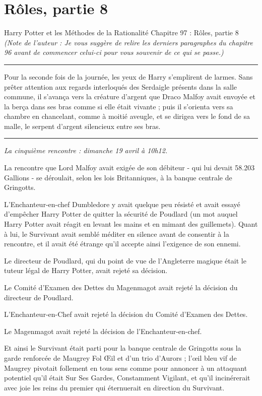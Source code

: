 
\chapter{Rôles, partie 8}
Harry Potter et les Méthodes de la Rationalité Chapitre 97 : Rôles, partie 8
\emph{(Note de l'auteur : Je vous suggère de relire les derniers paragraphes du chapitre 96 avant de commencer celui-ci pour vous souvenir de ce qui se passe.)} 
\par\noindent\rule{\textwidth}{0.4pt}
Pour la seconde fois de la journée, les yeux de Harry s'emplirent de larmes. Sans prêter attention aux regards interloqués des Serdaigle présents dans la salle commune, il s'avança vers la créature d'argent que Draco Malfoy avait envoyée et la berça dans ses bras comme si elle était vivante ; puis il s'orienta vers sa chambre en chancelant, comme à moitié aveugle, et se dirigea vers le fond de sa malle, le serpent d'argent silencieux entre ses bras.
\par\noindent\rule{\textwidth}{0.4pt}
\emph{La cinquième rencontre : dimanche 19 avril à 10h12.} 

La rencontre que Lord Malfoy avait exigée de son débiteur - qui lui devait 58.203 Gallions - se déroulait, selon les lois Britanniques, à la banque centrale de Gringotts.

L'Enchanteur-en-chef Dumbledore y avait quelque peu résisté et avait essayé d'empêcher Harry Potter de quitter la sécurité de Poudlard (un mot auquel Harry Potter avait réagit en levant les mains et en mimant des guillemets). Quant à lui, le Survivant avait semblé méditer en silence avant de consentir à la rencontre, et il avait été étrange qu'il accepte ainsi l'exigence de son ennemi.

Le directeur de Poudlard, qui du point de vue de l'Angleterre magique était le tuteur légal de Harry Potter, avait rejeté sa décision.

Le Comité d'Examen des Dettes du Magenmagot avait rejeté la décision du directeur de Poudlard.

L'Enchanteur-en-Chef avait rejeté la décision du Comité d'Examen des Dettes.

Le Magenmagot avait rejeté la décision de l'Enchanteur-en-chef.

Et ainsi le Survivant était parti pour la banque centrale de Gringotts sous la garde renforcée de Maugrey Fol Œil et d'un trio d'Aurors ; l'œil bleu vif de Maugrey pivotait follement en tous sens comme pour annoncer à un attaquant potentiel qu'il était Sur Ses Gardes, Constamment Vigilant, et qu'il incinérerait avec joie les reins du premier qui éternuerait en direction du Survivant.

